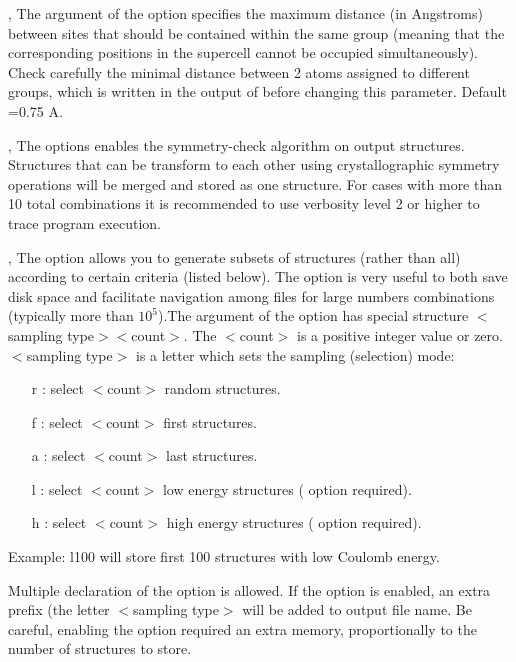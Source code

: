 \documentclass[a4paper,english]{article}
\begin{document}
\begin{Description}
\item[\OptArg{-t }{tolerance}, \OptArg{\Dd tolerance=}{tolerance}]
      The argument of the option specifies the maximum distance (in Angstroms) between sites that should be contained within the same group (meaning that the corresponding positions in the supercell cannot be occupied simultaneously). Check carefully the minimal distance between 2 atoms assigned to different groups, which is written in the output of  before changing this parameter. Default =0.75 A.

\item[\Opt{-m}, \Opt{\Dd merge-by-distance}]
      The options enables the symmetry-check algorithm on output structures. Structures that can be transform to each other using crystallographic symmetry operations will be merged and stored as one structure. For cases with more than 10 total combinations it is recommended to use verbosity level 2 or higher to trace program execution.
      
\item[\OptArg{-n }{selection}, \OptArg{\Dd store-structures=}{selection}]
      The option allows you to generate subsets of structures (rather than all) according to certain criteria (listed below). The option is very useful to both save disk space and facilitate navigation among files for large numbers combinations (typically more than $10^5$).The argument of the option has special structure $<$sampling type$><$count$>$. The $<$count$>$ is a positive integer value or zero. $<$sampling type$>$ is a letter which sets the sampling (selection) mode:
      \begin{itemize}
        \item[r]: select $<$count$>$ random structures.
        \item[f]: select $<$count$>$ first structures.
        \item[a]: select $<$count$>$ last structures.
        \item[l]: select $<$count$>$ low energy structures ( option required).
        \item[h]: select $<$count$>$ high energy structures ( option required).
      \end{itemize}
      Example: l100 will store first 100 structures with low Coulomb energy.
      
      Multiple declaration of the option is allowed. If the option is enabled, an extra prefix (the letter $<$sampling type$>$ will be added to output file name. Be careful, enabling the option required an extra memory, proportionally to the number of structures to store.


\end{Description}
\end{document}
